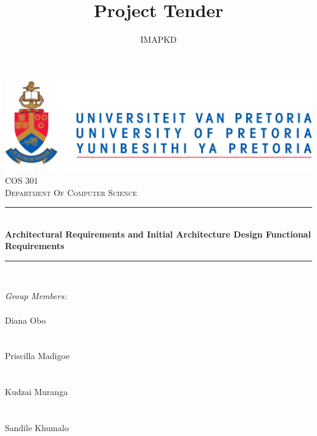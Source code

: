 \documentclass[a4paper,12pt]{article}
\author{IMAPKD}
\title{ Project Tender}
\newcommand{\HRule}{\rule{\linewidth}{0.5mm}}
\begin{document}
\setlength{\parskip}{6pt}

\begin{titlepage}

\begin{center}
\includegraphics[width=1\textwidth]{./University_of_Pretoria_Logo.PNG}\\[0.4cm]  
\textsc{\LARGE COS 301}\\[0.9cm]
\textsc{\LARGE Department Of Computer Science}\\[0.3cm]


\HRule \\[0.4cm]
{ \huge \bfseries Architectural Requirements and  Initial Architecture Design Functional Requirements}\\[0.1cm]
\HRule \\[0.4cm]  


\begin{minipage}{0.4\textwidth}
\begin{flushleft} \large

\emph{\Large Group Members:}\\[0.4cm]    
\emph{}\\
{\Large Diana {Obo}} \\
\emph{}\\
\emph{}\\
{\Large Priscilla {Madigoe}}\\
\emph{}\\
\emph{}\\
{\Large Kudzai {Muranga}} \\
\emph{}\\
\emph{}\\
{\Large Sandile {Khumalo}}\\
\emph{}\\
\emph{}\\

\end{flushleft}
\end{minipage}
\begin{minipage}{0.4\textwidth}
\begin{flushright} \large


\end{flushright}
\end{minipage}
\end{center}
\end{titlepage}
\end{document}
